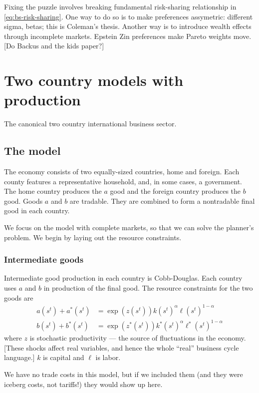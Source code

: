 \documentclass[11pt,pdftex,twoside,letterpaper]{exam}
\begin{document}
Fixing the puzzle involves breaking fundamental risk-sharing relationship in \eqref{eq:bs-risk-sharing}. One way to do so is to make preferences assymetric: different sigma, betas; this is Coleman's thesis. Another way is to introduce wealth effects through incomplete markets. Epstein Zin preferences make Pareto weights move. [Do Backus and the kids paper?]

\section{Two country models with production}
The canonical two country international business sector.
\subsection{The model}
The economy consists of two equally-sized countries, home and foreign. Each county features a representative household, and, in some cases, a government. The home country produces the $a$ good and the foreign country produces the $b$ good. Goods $a$ and $b$ are tradable. They are combined to form a nontradable final good in each country.

We focus on the model with complete markets, so that we can solve the planner's problem. We begin by laying out the resource constraints.

\subsubsection*{Intermediate goods}
Intermediate good production in each country is Cobb-Douglas. Each country uses $a$ and $b$ in production of the final good. The resource constraints for the two goods are
\begin{align}
  a(s^t) + a^*(s^t) &= \exp(z(s^t))k(s^t)^\alpha \ell(s^t)^{1-\alpha}\label{eq:irbc-intermediate-1}\\
  b(s^t) + b^*(s^t) &= \exp(z^*(s^t))k^*(s^t)^\alpha \ell^*(s^t)^{1-\alpha}
\end{align}
where $z$ is stochastic productivity --- the source of fluctuations in the economy. [These shocks affect real variables, and hence the whole ``real'' business cycle language.] $k$ is capital and $\ell$ is labor.

We have no trade costs in this model, but if we included them (and they were iceberg costs, not tariffs!) they would show up here.
\end{document}
